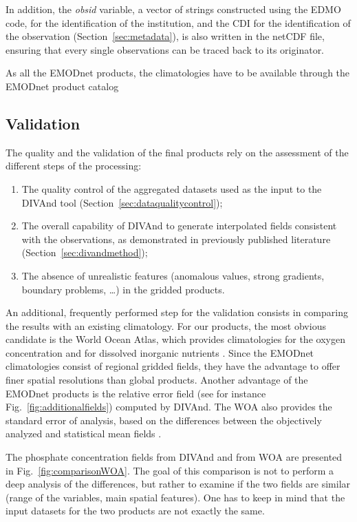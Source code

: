 \documentclass[essd, manuscript]{copernicus}
\begin{document}
In addition, the \textit{obsid} variable, a vector of strings constructed using the EDMO code, for the identification of the institution, and the CDI for the identification of the observation (Section~\ref{sec:metadata}), is also written in the netCDF file, ensuring that every single observations can be traced back to its originator.

As all the EMODnet products, the climatologies have to be available through the EMODnet product catalog \citep[][https://emodnet.ec.europa.eu/en]{BEJA2024}

\subsection{Validation}

The quality and the validation of the final products rely on the assessment of the different steps of the processing:
\begin{enumerate}
\item The quality control of the aggregated datasets used as the input to the DIVAnd tool (Section~\ref{sec:dataqualitycontrol});
\item The overall capability of DIVAnd to generate interpolated fields consistent with the observations, as demonstrated in previously published literature (Section~\ref{sec:divandmethod});
\item The absence of unrealistic features (anomalous values, strong gradients, boundary problems, \ldots) in the gridded products.
\end{enumerate}

An additional, frequently performed step for the validation consists in comparing the results with an existing climatology. For our products, the most obvious candidate is the World Ocean Atlas, which provides climatologies for the oxygen concentration \citep{Garcia2024} and for dissolved inorganic nutrients \citep{Garcia2024b}. Since the EMODnet climatologies consist of regional gridded fields, they have the advantage to offer finer spatial resolutions than global products. Another advantage of the EMODnet products is the relative error field (see for instance Fig.~\ref{fig:additionalfields}) computed by DIVAnd. The WOA also provides the standard error of analysis, based on the differences between the objectively analyzed and statistical mean fields \citep{Levitus2012}.

The phosphate concentration fields from DIVAnd and from WOA are presented in Fig.~\ref{fig:comparisonWOA}. The goal of this comparison is not to perform a deep analysis of the differences, but rather to examine if the two fields are similar (range of the variables, main spatial features). One has to keep in mind that the input datasets for the two products are not exactly the same. 
\end{document}
